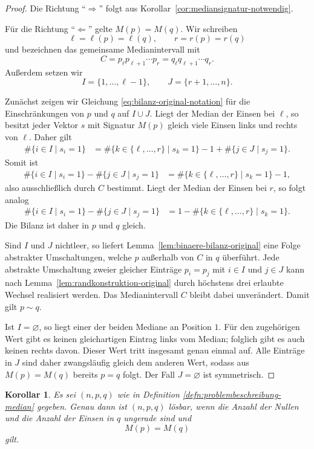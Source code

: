 \documentclass[12pt]{article}
\newtheorem{cor}[thm]{Korollar}
\begin{document}
\begin{proof}
Die Richtung ``$\Rightarrow$'' folgt aus
Korollar~\ref{cor:mediansignatur-notwendig}.

Für die Richtung ``$\Leftarrow$'' gelte $M(p)=M(q)$. Wir schreiben
\[
\ell=\ell(p)=\ell(q),
\qquad
r=r(p)=r(q)
\]
und bezeichnen das gemeinsame Medianintervall mit
\[
C=p_\ell p_{\ell+1}\cdots p_r
 =q_\ell q_{\ell+1}\cdots q_r.
\]
Außerdem setzen wir
\[
I=\{1,\dots,\ell-1\},
\qquad
J=\{r+1,\dots,n\}.
\]

Zunächst zeigen wir Gleichung
\eqref{eq:bilanz-original-notation} für die Einschränkungen von $p$ und $q$
auf $I\cup J$. Liegt der Median der Einsen bei $\ell$, so besitzt jeder
Vektor $s$ mit Signatur $M(p)$ gleich viele Einsen links und rechts von
$\ell$. Daher gilt
\begin{align*}
\#\{i\in I\mid s_i=1\}
&=
\#\{k\in\{\ell,\dots,r\}\mid s_k=1\}-1
 +\#\{j\in J\mid s_j=1\}.
\end{align*}
Somit ist
\begin{align*}
\#\{i\in I\mid s_i=1\}
-\#\{j\in J\mid s_j=1\}
&=
\#\{k\in\{\ell,\dots,r\}\mid s_k=1\}-1,
\end{align*}
also ausschließlich durch $C$ bestimmt. Liegt der Median der Einsen bei $r$,
so folgt analog
\begin{align*}
\#\{i\in I\mid s_i=1\}
-\#\{j\in J\mid s_j=1\}
&=
1-\#\{k\in\{\ell,\dots,r\}\mid s_k=1\}.
\end{align*}
Die Bilanz ist daher in $p$ und $q$ gleich.

Sind $I$ und $J$ nichtleer, so liefert
Lemma~\ref{lem:binaere-bilanz-original} eine Folge abstrakter Umschaltungen,
welche $p$ außerhalb von $C$ in $q$ überführt. Jede abstrakte Umschaltung
zweier gleicher Einträge $p_i=p_j$ mit $i\in I$ und $j\in J$ kann nach
Lemma~\ref{lem:randkonstruktion-original} durch höchstens drei erlaubte
Wechsel realisiert werden. Das Medianintervall $C$ bleibt dabei unverändert.
Damit gilt $p\sim q$.

Ist $I=\varnothing$, so liegt einer der beiden Mediane an Position $1$. Für
den zugehörigen Wert gibt es keinen gleichartigen Eintrag links vom Median;
folglich gibt es auch keinen rechts davon. Dieser Wert tritt insgesamt genau
einmal auf. Alle Einträge in $J$ sind daher zwangsläufig gleich dem anderen
Wert, sodass aus $M(p)=M(q)$ bereits $p=q$ folgt. Der Fall
$J=\varnothing$ ist symmetrisch.
\end{proof}

\begin{cor}
Es sei $(n,p,q)$ wie in Definition
\ref{defn:problembeschreibung-median} gegeben. Genau dann ist $(n,p,q)$
lösbar, wenn die Anzahl der Nullen und die Anzahl der Einsen in $q$ ungerade
sind und
\[
M(p)=M(q)
\]
gilt.
\label{cor:algorithmus-kriterium-original}
\end{cor}
\end{document}
